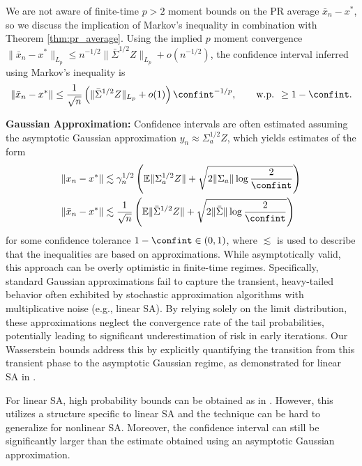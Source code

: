 \documentclass[11pt]{article}
\begin{document}
We are not aware of finite-time $p > 2$ moment bounds on the PR average $ \bar{x}_n - x^*$, so we discuss the implication of Markov's inequality in combination with Theorem \ref{thm:pr_average}.
Using the implied $p$ moment convergence $\lVert \bar{x}_n - x^* \rVert_{L_p} \leq n^{-1/2} \lVert \bar{\Sigma}^{1/2}Z \rVert_{L_p} + o(n^{-1/2})$, the confidence interval inferred using Markov's inequality is
\begin{equation}\label{eq:markov_pr}
    \lVert \bar{x}_n - x^* \rVert \leq \frac{1}{\sqrt{n}} \left(\lVert \bar{\Sigma}^{1/2} Z \rVert_{L_p}  + o(1)\right)\confint^{-1/p},
    \qquad 
    \text{w.p. }
    \geq 1 - \confint
    .  
\end{equation}




\textbf{Gaussian Approximation:} 
Confidence intervals are often estimated assuming the asymptotic Gaussian approximation $y_n \approx \Sigma_a^{1/2} Z$, which yields estimates of the form
\begin{equation}\label{eq:gaussian_tail_estimates}
\begin{split}
    \lVert x_n - x^* \rVert 
    &\lesssim 
    \gamma_n^{1/2} \left(\mathbb{E}\lVert \Sigma_a^{1/2} Z \rVert 
    + 
   \sqrt{2  \lVert \Sigma_a \rVert \log \frac{2}{\confint}}     \right)
   \\ 
   \lVert \bar{x}_n - x^* \rVert 
   &\lesssim 
   \frac{1}{\sqrt{n}} \left(\mathbb{E}\lVert \bar{\Sigma}^{1/2}Z \rVert + \sqrt{2 \lVert \bar{\Sigma} \rVert \log \frac{2}{\confint}} \right) 
\end{split}
\end{equation}
for some confidence tolerance $1 - \confint \in (0, 1)$, where $\lesssim$ is used to describe that the inequalities are based on approximations. 
While asymptotically valid, this approach can be overly optimistic in finite-time regimes. 
Specifically, standard Gaussian approximations fail to capture the transient, heavy-tailed behavior often exhibited by stochastic approximation algorithms with multiplicative noise (e.g., linear SA). 
By relying solely on the limit distribution, these approximations neglect the convergence rate of the tail probabilities, potentially leading to significant underestimation of risk in early iterations. 
Our Wasserstein bounds address this by explicitly quantifying the transition from this transient phase to the asymptotic Gaussian regime, as demonstrated for linear SA in . 



For linear SA, high probability bounds can be obtained as in \citep[Theorem 1]{durmus2021tighthighprobabilitybounds}. 
However, this utilizes a structure specific to linear SA and the technique can be hard to generalize for nonlinear SA. 
Moreover, the confidence interval can still be significantly larger than the estimate obtained using an asymptotic Gaussian approximation. 
\end{document}
